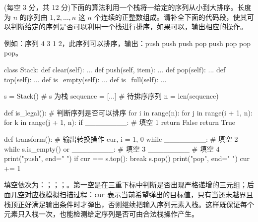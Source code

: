 \begin{question}
(每空 3 分，共 12 分)下面的算法利用一个栈将一给定的序列从小到大排序。长度为 $n$ 的序列由 $1, 2, \dots, n$ 这 $n$ 个连续的正整数组成。请补全下面的代码段，使其可以判断给定的序列是否可以利用一个栈进行排序，如果可以，输出相应的操作。

例如：序列 4 3 1 2，此序列可以排序，输出：push push push pop push pop pop pop。

\begin{pycode}
class Stack:
    def clear(self): ...
    def push(self, item): ...
    def pop(self): ...
    def top(self): ...
    def is_empty(self): ...
    def is_full(self): ...


s = Stack()                  # s 为栈
sequence = [...]             # 待排序序列
n = len(sequence)


def is_legal():              # 判断序列是否可以排序
    for i in range(n):
        for j in range(i + 1, n):
            for k in range(j + 1, n):
                if ________:          # 填空 1
                    return False
    return True


def transform():             # 输出转换操作
    cur, i = 1, 0
    while ________:           # 填空 2
        while s.is_empty() or ________:    # 填空 3
            ________          # 填空 4
            print("push", end=" ")
            if cur == s.top():
                break
        s.pop()
        print("pop", end=" ")
        cur += 1
\end{pycode}
\begin{solution}
填空依次为：\texttt{}；\texttt{}；\texttt{}；\texttt{}。第一空是在三重下标中判断是否出现严格递增的三元组；后面几空对应栈模拟扫描过程：\texttt{cur} 表示当前希望弹出的目标值，只有当还未越界且栈顶正好满足输出条件时才弹出，否则继续把输入序列元素入栈。这样既保证每个元素只入栈一次，也能检测给定序列是否可由合法栈操作产生。
\end{solution}
\end{question}

